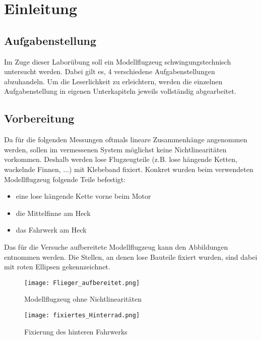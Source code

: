 \chapter{Einleitung}
\label{sec: Einleitung}

\section{Aufgabenstellung}
    Im Zuge dieser Laborübung soll ein Modellflugzeug schwingungstechnisch
    untersucht werden. Dabei gilt es, 4 verschiedene Aufgabenstellungen
    abzuhandeln. Um die Leserlichkeit zu erleichtern, werden die einzelnen
    Aufgabenstellung in eigenen Unterkapiteln jeweils vollständig abgearbeitet.

\section{Vorbereitung}
    Da für die folgenden Messungen oftmals lineare Zusammenhänge angenommen
    werden, sollen im vermessenen System möglichst keine Nichtlinearitäten
    vorkommen. Deshalb werden lose Flugzeugteile (z.B. lose hängende Ketten,
    wackelnde Finnen, ...) mit Klebeband fixiert.
    Konkret wurden beim verwendeten Modellflugzeug folgende Teile befestigt:

    \begin{itemize}
        \item eine lose hängende Kette vorne beim Motor
        \item die Mittelfinne am Heck
        \item das Fahrwerk am Heck
    \end{itemize}

    \noindent
    Das für die Versuche aufbereitete Modellflugzeug kann den Abbildungen
    entnommen werden. Die Stellen, an denen lose Bauteile fixiert wurden, sind
    dabei mit roten Ellipsen gekennzeichnet.

    \begin{figure}[H]
        \centering
        \texttt{[image: Flieger\_aufbereitet.png]}
        \caption{Modellflugzeug ohne Nichtlinearitäten}
        \label{fig: Modellflugzeug_vorbereitet}
    \end{figure}

    \begin{figure}[H]
        \centering
        \texttt{[image: fixiertes\_Hinterrad.png]}
        \caption{Fixierung des hinteren Fahrwerks}
        \label{fig: Hinterrad_fixiert}
    \end{figure}

